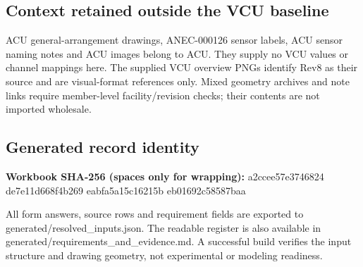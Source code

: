 \documentclass[11pt]{article}
\begin{document}
\subsection*{Context retained outside the VCU baseline}
ACU general-arrangement drawings, ANEC-000126 sensor labels, ACU sensor naming notes and ACU images belong to ACU. They supply no VCU values or channel mappings here. The supplied VCU overview PNGs identify Rev8 as their source and are visual-format references only. Mixed geometry archives and note links require member-level facility/revision checks; their contents are not imported wholesale.
\subsection*{Generated record identity}
\textbf{Workbook SHA-256 (spaces only for wrapping):} a2ccee57e3746824 de7e11d668f4b269 eabfa5a15c16215b eb01692c58587baa\par
All form answers, source rows and requirement fields are exported to generated/resolved\_inputs.json. The readable register is also available in generated/requirements\_and\_evidence.md. A successful build verifies the input structure and drawing geometry, not experimental or modeling readiness.
\end{document}

